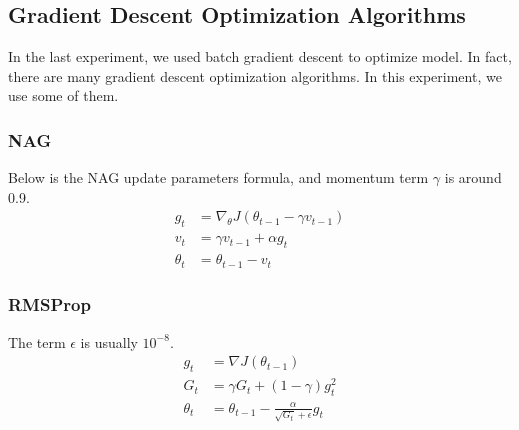 \documentclass[journal, a4paper]{IEEEtran}
\begin{document}

\subsection{Gradient Descent Optimization Algorithms}
In the last experiment, we used batch gradient descent to optimize model.
In fact, there are many gradient descent optimization algorithms. In this experiment, we use some of them.

\subsubsection{NAG}
Below is the NAG update parameters formula, and momentum term $\gamma$ is around 0.9.
\begin{equation}
    \begin{aligned}
        g_t&= \nabla_\theta J(\theta_{t-1}-\gamma v_{t-1})\\
        v_t&=\gamma v_{t-1}+\alpha g_t\\
        \theta_t &= \theta_{t-1} - v_t
    \end{aligned}
\end{equation}


\subsubsection{RMSProp}
The term $\epsilon$ is usually $10^{-8}$.
\begin{equation}
    \begin{aligned}
        g_t&=\nabla J(\theta_{t-1})\\
        G_t&=\gamma G_t + (1-\gamma)g_t^2\\
        \theta_t&=\theta_{t-1}-\frac{\alpha}{\sqrt{G_t}+\epsilon}g_t
    \end{aligned}
\end{equation}
\end{document}
